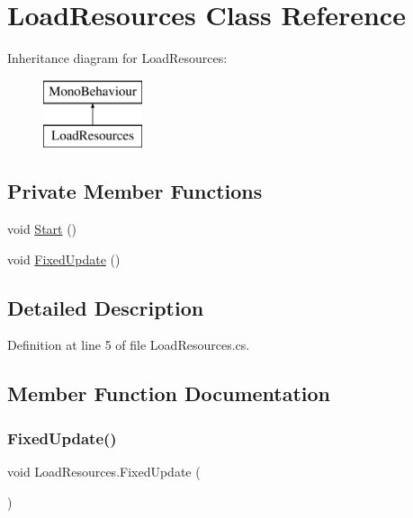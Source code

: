 \hypertarget{class_load_resources}{}\section{Load\+Resources Class Reference}
\label{class_load_resources}
Inheritance diagram for Load\+Resources\+:\begin{figure}[H]
\begin{center}
\leavevmode
\includegraphics[height=2.000000cm]{class_load_resources}
\end{center}
\end{figure}
\subsection*{Private Member Functions}
\begin{DoxyCompactItemize}
\item 
void \hyperlink{class_load_resources_ac4b32bb35a4c789b1b3fe3b5044001a9}{Start} ()
\item 
void \hyperlink{class_load_resources_a04079f1843cc361e1dc63237af7f24fd}{Fixed\+Update} ()
\end{DoxyCompactItemize}


\subsection{Detailed Description}


Definition at line 5 of file Load\+Resources.\+cs.



\subsection{Member Function Documentation}
\mbox{\label{class_load_resources_a04079f1843cc361e1dc63237af7f24fd}} 
\subsubsection{\texorpdfstring{Fixed\+Update()}{FixedUpdate()}}
{\footnotesize\ttfamily void Load\+Resources.\+Fixed\+Update (\begin{DoxyParamCaption}{ }\end{DoxyParamCaption})\hspace{0.3cm}{\ttfamily [private]}}



